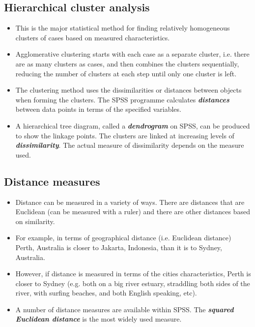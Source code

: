 \documentclass[a4paper,12pt]{article}
\begin{document}
\subsection{Hierarchical cluster analysis}
\begin{itemize}
	\item This is the major statistical method for finding relatively homogeneous clusters of cases based on measured characteristics.
	
\item Agglomerative clustering starts with each case as a separate cluster, i.e. there are as many clusters as cases, and then combines the clusters sequentially, reducing the number of clusters at each step until only one cluster is left.
	
\item The clustering method uses the dissimilarities or distances between objects when forming the clusters. The SPSS programme calculates \textbf{\textit{distances}} between data points in terms of the specified variables.
	
\item A hierarchical tree diagram, called a \textbf{\textit{dendrogram }} on SPSS, can be produced to show the linkage points. The clusters are linked at increasing levels of \textbf{\textit{dissimilarity}}.
	The actual measure of dissimilarity depends on the measure used.
	
\end{itemize}


\subsection{Distance measures}
\begin{itemize}
	\item Distance can be measured in a variety of ways. There are distances that are Euclidean (can be measured with a ruler) and there are other distances based on similarity.
	\item  For example, in terms of
	geographical distance (i.e. Euclidean distance) Perth, Australia is closer to Jakarta, Indonesia, than it is to Sydney, Australia.
	
\item However, if distance is measured in terms of the cities characteristics, Perth is closer to Sydney (e.g. both on a big river estuary, straddling both sides of the river, with surfing beaches, and both English speaking, etc). 
\item A number of distance measures are available within SPSS. The \textbf{\textit{squared Euclidean distance}} is the most widely used measure.
\end{itemize}
\end{document}
